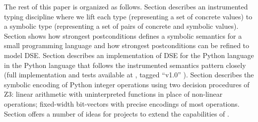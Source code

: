 ﻿\documentclass{IOS-Book-Article}
\begin{document}
\begin{mdP}[data-line={306}]%
{}The rest of this paper is organized as follows. Section%
{}{\mdNbsp}%
{} 
describes an instrumented typing discipline where we lift each type (representing 
a set of concrete values) to a symbolic type (representing
a set of pairs of concrete and symbolic values).
Section%
{}{\mdNbsp}%
{} shows how strongest postconditions defines a symbolic
semantics for a small programming language and how strongest postconditions
can be refined to model DSE.
Section%
{}{\mdNbsp}%
{} describes an implementation of DSE for the Python language
in the Python language that follows the instrumented semantics pattern closely
(full implementation and tests available at%
{}{\mdNbsp}%
{}, tagged %
{}{\textquotedblleft}v1.0{\textquotedblright}%
{}).
Section%
{}{\mdNbsp}%
{} describes the symbolic encoding of Python integer 
operations using two decision procedures of Z3: linear arithmetic with
uninterpreted functions in place of non-linear operations;
fixed-width bit-vectors with precise encodings of most operations.
Section%
{}{\mdNbsp}%
{} offers a number of ideas for projects
to extend the capabilities of%
{}{\mdNbsp}%
{}.%
\end{mdP}%
\end{document}
